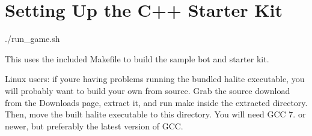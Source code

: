 \chapter{Setting Up the C++ Starter Kit }
\hypertarget{md__r_e_a_d_m_e}{}\label{md__r_e_a_d_m_e}
\label{md__r_e_a_d_m_e_autotoc_md0}%
%


\begin{DoxyVerb}./run_game.sh
\end{DoxyVerb}


This uses the included Makefile to build the sample bot and starter kit.

Linux users:\+ if you\textquotesingle{}re having problems running the bundled {\ttfamily halite} executable, you will probably want to build your own from source. Grab the source download from the Downloads page, extract it, and run {\ttfamily make} inside the extracted directory. Then, move the built {\ttfamily halite} executable to this directory. You will need GCC 7. or newer, but preferably the latest version of GCC. 